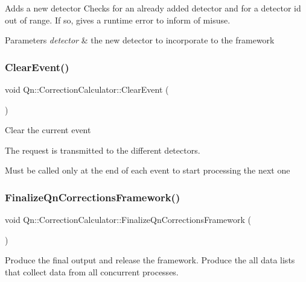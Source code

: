 Adds a new detector Checks for an already added detector and for a detector id out of range. If so, gives a runtime error to inform of misuse. 
\begin{DoxyParams}{Parameters}
{\em detector} & the new detector to incorporate to the framework \\
\hline
\end{DoxyParams}
\mbox{\label{classQn_1_1CorrectionCalculator_aaafca143aa07fcc93936b53877e65452}} 
\subsubsection{\texorpdfstring{Clear\+Event()}{ClearEvent()}}
{\footnotesize\ttfamily void Qn\+::\+Correction\+Calculator\+::\+Clear\+Event (\begin{DoxyParamCaption}{ }\end{DoxyParamCaption})\hspace{0.3cm}{\ttfamily [inline]}}

Clear the current event

The request is transmitted to the different detectors.

Must be called only at the end of each event to start processing the next one \mbox{\label{classQn_1_1CorrectionCalculator_a1a8056c9dcc824dd62057d41cf9ba4c0}} 
\subsubsection{\texorpdfstring{Finalize\+Qn\+Corrections\+Framework()}{FinalizeQnCorrectionsFramework()}}
{\footnotesize\ttfamily void Qn\+::\+Correction\+Calculator\+::\+Finalize\+Qn\+Corrections\+Framework (\begin{DoxyParamCaption}{ }\end{DoxyParamCaption})}

Produce the final output and release the framework. Produce the all data lists that collect data from all concurrent processes. \mbox{\label{classQn_1_1CorrectionCalculator_a424e42bfb3c9d9591463c41644c9f6f6}} 
